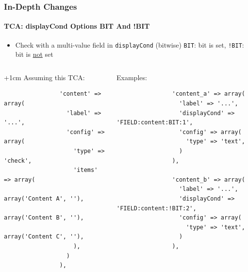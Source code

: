 
\begin{frame}[fragile]
	\frametitle{In-Depth Changes}
	\framesubtitle{TCA: displayCond Options BIT And !BIT}

	\lstset{
		basicstyle=\tiny\ttfamily
	}

	\begin{itemize}
		\item Check with a multi-value field in \texttt{displayCond} (bitwise)\newline
			\texttt{BIT}: bit is set, \texttt{!BIT}: bit is \underline{not} set
	\end{itemize}

	\begin{columns}[T]

		\begin{column}{.5\textwidth}

			\advance\leftskip+1cm
			Assuming this TCA:

			\lstset{xleftmargin=1cm}

			\begin{lstlisting}
				'content' => array(
				  'label' => '...',
				  'config' => array(
				    'type' => 'check',
				    'items' => array(
				      array('Content A', ''),
				      array('Content B', ''),
				      array('Content C', ''),
				    ),
				  )
				),
			\end{lstlisting}

		\end{column}
		\begin{column}{.5\textwidth}

			Examples:

			\begin{lstlisting}
				'content_a' => array(
				  'label' => '...',
				  'displayCond' => 'FIELD:content:BIT:1',
				  'config' => array(
				    'type' => 'text',
				  )
				),

				'content_b' => array(
				  'label' => '...',
				  'displayCond' => 'FIELD:content:!BIT:2',
				  'config' => array(
				    'type' => 'text',
				  )
				),
			\end{lstlisting}
		\end{column}

	\end{columns}

\end{frame}

